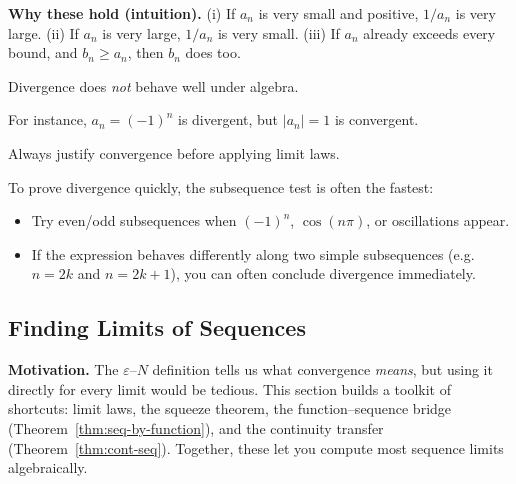 \noindent
\textbf{Why these hold (intuition).}
(i) If $a_n$ is very small and positive, $1/a_n$ is very large.
(ii) If $a_n$ is very large, $1/a_n$ is very small.
(iii) If $a_n$ already exceeds every bound, and $b_n\ge a_n$, then $b_n$ does too.

\begin{commonmistake}

Divergence does \emph{not} behave well under algebra.

For instance, $a_n=(-1)^n$ is divergent, but $|a_n|=1$ is convergent.

Always justify convergence before applying limit laws.

\end{commonmistake}

\begin{examtip}

To prove divergence quickly, the subsequence test is often the fastest:

\begin{itemize}

\item Try even/odd subsequences when $(-1)^n$, $\cos(n\pi)$, or oscillations appear.

\item If the expression behaves differently along two simple subsequences (e.g.\ $n=2k$ and $n=2k+1$), you can often conclude divergence immediately.

\end{itemize}

\end{examtip}


\subsection{Finding Limits of Sequences}

\textbf{Motivation.}
The $\varepsilon$--$N$ definition tells us what convergence \emph{means}, but using it directly for every limit would be tedious. This section builds a toolkit of shortcuts: limit laws, the squeeze theorem, the function--sequence bridge (Theorem~\ref{thm:seq-by-function}), and the continuity transfer (Theorem~\ref{thm:cont-seq}). Together, these let you compute most sequence limits algebraically.

